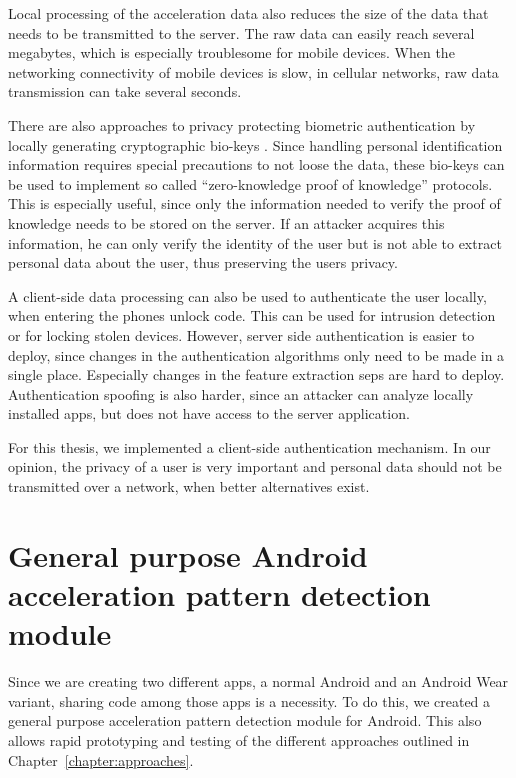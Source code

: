 Local processing of the acceleration data also reduces the size of the data that needs to be transmitted to the server. The raw data can easily reach several megabytes, which is especially troublesome for mobile devices. When the networking connectivity of mobile devices is slow, \eg in cellular networks, raw data transmission can take several seconds.

There are also approaches to privacy protecting biometric authentication by locally generating cryptographic bio-keys \cite{bhargav2006privacy, verbitskiy2003reliable, ross2011visual}. Since handling personal identification information requires special precautions to not loose the data, these bio-keys can be used to implement so called ``zero-knowledge proof of knowledge'' protocols. This is especially useful, since only the information needed to verify the proof of knowledge needs to be stored on the server. If an attacker acquires this information, he can only verify the identity of the user but is not able to extract personal data about the user, thus preserving the users privacy.

A client-side data processing can also be used to authenticate the user locally, \eg when entering the phones unlock code. This can be used for intrusion detection or for locking stolen devices. However, server side authentication is easier to deploy, since changes in the authentication algorithms only need to be made in a single place. Especially changes in the feature extraction seps are hard to deploy. Authentication spoofing is also harder, since an attacker can analyze locally installed apps, but does not have access to the server application.

For this thesis, we implemented a client-side authentication mechanism. In our opinion, the privacy of a user is very important and personal data should not be transmitted over a network, when better alternatives exist.

\section{General purpose Android acceleration pattern detection module}
Since we are creating two different apps, a normal Android and an Android Wear variant, sharing code among those apps is a necessity. To do this, we created a general purpose acceleration pattern detection module for Android. This also allows rapid prototyping and testing of the different approaches outlined in Chapter~\ref{chapter:approaches}.


